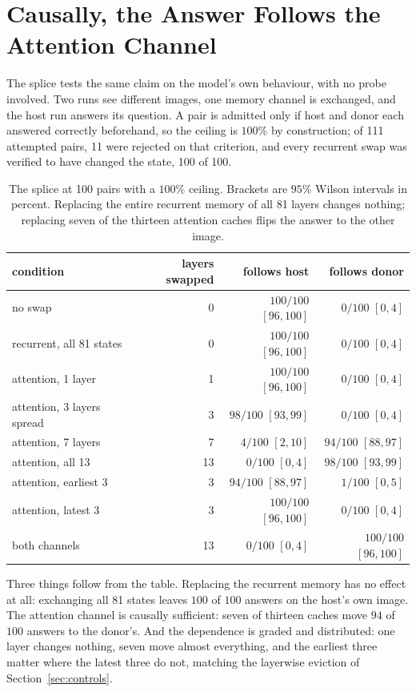 \section{Causally, the Answer Follows the Attention Channel}
\label{sec:splice}

The splice tests the same claim on the model's own behaviour, with no probe
involved. Two runs see different images, one memory channel is exchanged, and
the host run answers its question. A pair is admitted only if host and donor
each answered correctly beforehand, so the ceiling is $100\%$ by construction;
of 111 attempted pairs, 11 were rejected on that criterion, and every
recurrent swap was verified to have changed the state, 100 of 100.

\begin{table}[t]
\centering\small
\begin{tabular}{lrrr}
\toprule
condition & layers swapped & follows host & follows donor \\
\midrule
no swap                       & 0  & $100/100$ $[96,100]$ & $0/100$ $[0,4]$ \\
recurrent, all 81 states      & 0  & $100/100$ $[96,100]$ & $0/100$ $[0,4]$ \\
\addlinespace
attention, 1 layer            & 1  & $100/100$ $[96,100]$ & $0/100$ $[0,4]$ \\
attention, 3 layers spread    & 3  & $98/100$ $[93,99]$   & $0/100$ $[0,4]$ \\
attention, 7 layers           & 7  & $4/100$ $[2,10]$     & $94/100$ $[88,97]$ \\
attention, all 13             & 13 & $0/100$ $[0,4]$      & $98/100$ $[93,99]$ \\
\addlinespace
attention, earliest 3         & 3  & $94/100$ $[88,97]$   & $1/100$ $[0,5]$ \\
attention, latest 3           & 3  & $100/100$ $[96,100]$ & $0/100$ $[0,4]$ \\
both channels                 & 13 & $0/100$ $[0,4]$      & $100/100$ $[96,100]$ \\
\bottomrule
\end{tabular}
\caption{The splice at 100 pairs with a $100\%$ ceiling. Brackets are $95\%$
Wilson intervals in percent. Replacing the entire recurrent memory of all 81
layers changes nothing; replacing seven of the thirteen attention caches flips
the answer to the other image.}
\label{tab:splice}
\end{table}

Three things follow from the table. Replacing the recurrent memory has no
effect at all: exchanging all 81 states leaves $100$ of $100$ answers on the
host's own image. The attention channel is causally sufficient: seven of
thirteen caches move $94$ of $100$ answers to the donor's. And the dependence
is graded and distributed: one layer changes nothing, seven move almost
everything, and the earliest three matter where the latest three do not,
matching the layerwise eviction of Section~\ref{sec:controls}.

